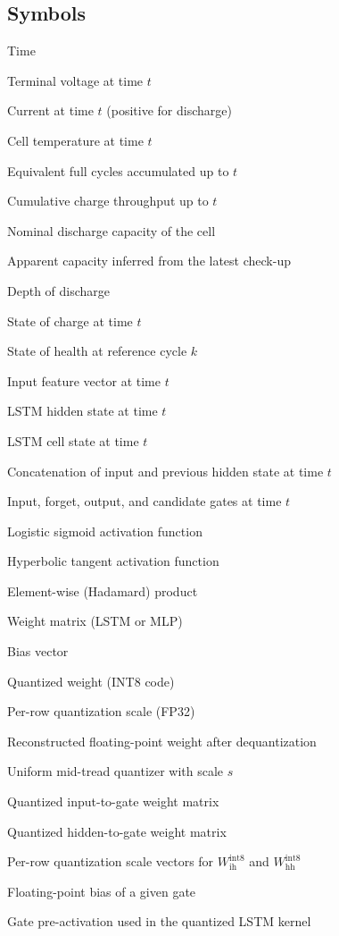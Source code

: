 \documentclass[final,3p,times]{elsarticle}
\begin{document}
\subsection*{Symbols}
\begin{description}[style=multiline,leftmargin=1.5cm,font=\bfseries]
\item[$t$] Time
\item[$U(t)$] Terminal voltage at time $t$
\item[$I(t)$] Current at time $t$ (positive for discharge)
\item[$T(t)$] Cell temperature at time $t$
\item[$\mathrm{EFC}(t)$] Equivalent full cycles accumulated up to $t$
\item[$Q_c(t)$] Cumulative charge throughput up to $t$
\item[$C_{\mathrm{nom}}$] Nominal discharge capacity of the cell
\item[$C_{\mathrm{app}}$] Apparent capacity inferred from the latest check-up
\item[$\mathrm{DoD}$] Depth of discharge
\item[$\mathrm{SOC}(t)$] State of charge at time $t$
\item[$\mathrm{SOH}_k$] State of health at reference cycle $k$
\item[$\mathbf{x}_t$] Input feature vector at time $t$
\item[$\mathbf{h}_t$] LSTM hidden state at time $t$
\item[$\mathbf{c}_t$] LSTM cell state at time $t$
\item[$\mathbf{z}_t$] Concatenation of input and previous hidden state at time $t$
\item[$\mathbf{i}_t,\mathbf{f}_t,\mathbf{o}_t,\mathbf{g}_t$] Input, forget, output, and candidate gates at time $t$
\item[$\sigma(\cdot)$] Logistic sigmoid activation function
\item[$\tanh(\cdot)$] Hyperbolic tangent activation function
\item[$\odot$] Element-wise (Hadamard) product
\item[$W$] Weight matrix (LSTM or MLP)
\item[$b$] Bias vector
\item[$q$] Quantized weight (INT8 code)
\item[$s$] Per-row quantization scale (FP32)
\item[$\hat{w}$] Reconstructed floating-point weight after dequantization
\item[$\mathcal{Q}_s(\cdot)$] Uniform mid-tread quantizer with scale $s$
\item[$W_{\mathrm{ih}}^{\mathrm{int8}}$] Quantized input-to-gate weight matrix
\item[$W_{\mathrm{hh}}^{\mathrm{int8}}$] Quantized hidden-to-gate weight matrix
\item[$s_{\mathrm{ih}}, s_{\mathrm{hh}}$] Per-row quantization scale vectors for $W_{\mathrm{ih}}^{\mathrm{int8}}$ and $W_{\mathrm{hh}}^{\mathrm{int8}}$
\item[$b_{\mathrm{fp32}}$] Floating-point bias of a given gate
\item[$g$] Gate pre-activation used in the quantized LSTM kernel
\end{description}
\end{document}
